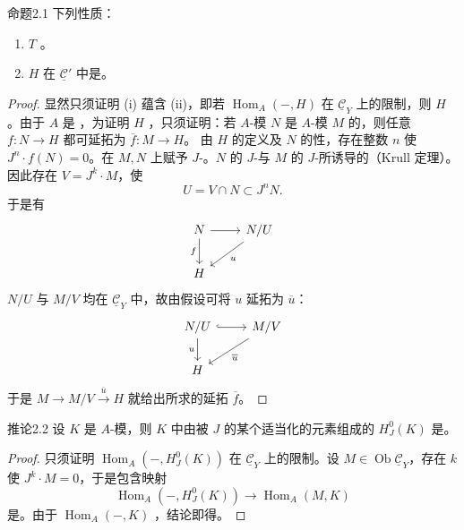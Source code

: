 \begin{SGAresult}{命题}{2.1}
下列性质：
\begin{enumerate}
\item[(i)]  $T$ 。
\item[(ii)] $H$ 在 $\underline{\mathcal C}'$ 中是。
\end{enumerate}
\end{SGAresult}
\begin{proof}
显然只须证明 (i) 蕴含 (ii)，即若 $\operatorname{Hom}_A(-,H)$ 在 $\underline{\mathcal C}_Y$ 上的限制，则 $H$ 。由于 $A$ 是 ，为证明 $H$ ，只须证明：若 $A$-模 $N$ 是 $A$-模 $M$ 的，则任意 $f:N\to H$ 都可延拓为 $\overline f:M\to H$。
由 $H$ 的定义及 $N$ 的性，存在整数 $n$ 使 $J^n\cdot f(N)=0$。在 $M,N$ 上赋予 $J$-。$N$ 的 $J$-与 $M$ 的 $J$-所诱导的（Krull 定理）。因此存在 $V=J^k\cdot M$，使
\[U=V\cap N\subset J^nN.\]
于是有
\[\begin{tikzcd}N\arrow[r]\arrow[d,"f"']&N/U\arrow[dl,"u"]\\H&\end{tikzcd}\]
$N/U$ 与 $M/V$ 均在 $\underline{\mathcal C}_Y$ 中，故由假设可将 $u$ 延拓为 $\overline u$：
\[\begin{tikzcd}N/U\arrow[r,hook]\arrow[d,"u"']&M/V\arrow[dl,"\overline u"]\\H&\end{tikzcd}\]
于是 $M\to M/V\xrightarrow{\overline u}H$ 就给出所求的延拓 $\overline f$。
\end{proof}
\begin{SGAresult}{推论}{2.2}
设 $K$ 是 $A$-模，则 $K$ 中由被 $J$ 的某个适当化的元素组成的 $H_J^0(K)$ 是。
\end{SGAresult}
\begin{proof}
只须证明 $\operatorname{Hom}_A(-,H_J^0(K))$ 在 $\underline{\mathcal C}_Y$ 上的限制。设 $M\in\operatorname{Ob}\underline{\mathcal C}_Y$，存在 $k$ 使 $J^k\cdot M=0$，于是包含映射
\[\operatorname{Hom}_A(-,H_J^0(K))\longrightarrow\operatorname{Hom}_A(M,K)\]
是。由于 $\operatorname{Hom}_A(-,K)$ ，结论即得。
\end{proof}
